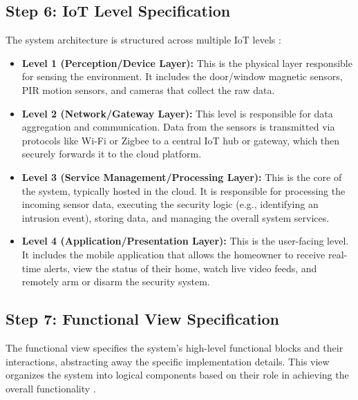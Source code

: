 \documentclass[conference]{IEEEtran}
\begin{document}
\subsection{Step 6: IoT Level Specification}
The system architecture is structured across multiple IoT levels \cite{seerangan_domain_specific_iot_home_automation_2022, cisco_gateway}:
\begin{itemize}
    \item \textbf{Level 1 (Perception/Device Layer):} This is the physical layer responsible for sensing the environment. It includes the door/window magnetic sensors, PIR motion sensors, and cameras that collect the raw data.

    \item \textbf{Level 2 (Network/Gateway Layer):} This level is responsible for data aggregation and communication. Data from the sensors is transmitted via protocols like Wi-Fi or Zigbee to a central IoT hub or gateway, which then securely forwards it to the cloud platform.

    \item \textbf{Level 3 (Service Management/Processing Layer):} This is the core of the system, typically hosted in the cloud. It is responsible for processing the incoming sensor data, executing the security logic (e.g., identifying an intrusion event), storing data, and managing the overall system services.

    \item \textbf{Level 4 (Application/Presentation Layer):} This is the user-facing level. It includes the mobile application that allows the homeowner to receive real-time alerts, view the status of their home, watch live video feeds, and remotely arm or disarm the security system.
\end{itemize}

\subsection{Step 7: Functional View Specification}
The functional view specifies the system's high-level functional blocks and their interactions, abstracting away the specific implementation details. This view organizes the system into logical components based on their role in achieving the overall functionality \cite{startertutorials_IoT_methodology, achtaich2021guidelines, tipirisetty_home_automation_case_study_2025, zwemer_smart_home_iot_part2_2015}.
\end{document}
